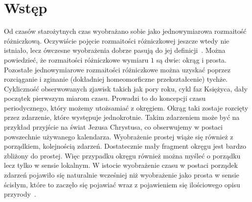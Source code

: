 \newpage
\section{Wstęp}
Od czasów starożytnych czas wyobrażano sobie jako jednowymiarowa 
rozmaitość różniczkową. 
Oczywiście pojęcie rozmaitości różniczkowej jeszcze wtedy nie istniało, 
lecz ówczesne wyobrażenia dobrze pasują do jej 
definicji~\cite{heller1993fizyka}. 
Można powiedzieć, że rozmaitości różniczkowe 
 wymiaru $1$ są dwie: okrąg i prosta. 
Pozostałe jednowymiarowe rozmaitości różniczkowe można uzyskać 
poprzez rozciąganie i zginanie (dokładniej homeomorficzne przekształcenie) 
tychże. 
Cykliczność obserwowanych zjawisk takich jak pory roku, cykl faz 
Księżyca, dały początek pierwszym miarom czasu. 
Prowadzi to do koncepcji czasu periodycznego, który możemy 
utożsamiać z okręgiem. 
Okrąg taki zostaje rozcięty przez zdarzenie, które występuje 
jednokrotnie. Takim zdarzeniem może być na przykład 
przyjście na świat Jezusa Chrystusa, co 
obserwujemy w postaci powszechnie 
używanego kalendarza. 
Wyobrażenie prostej wiąże się również z porządkiem, 
kolejnością zdarzeń. 
Dostatecznie mały fragment okręgu jest bardzo zbliżony do
prostej. Więc przypadku okręgu również można myśleć o
 porządku lecz tylko w sensie lokalnym. 
W istocie wyobrażenie czasu w postaci porządek zdarzeń
pojawiło się naturalnie wcześniej niż wyobrażenie jako prosta 
w sensie ścisłym, które to zaczęło się pojawiać wraz 
z pojawieniem się ilościowego opisu przyrody~\cite{czasHeller}.


